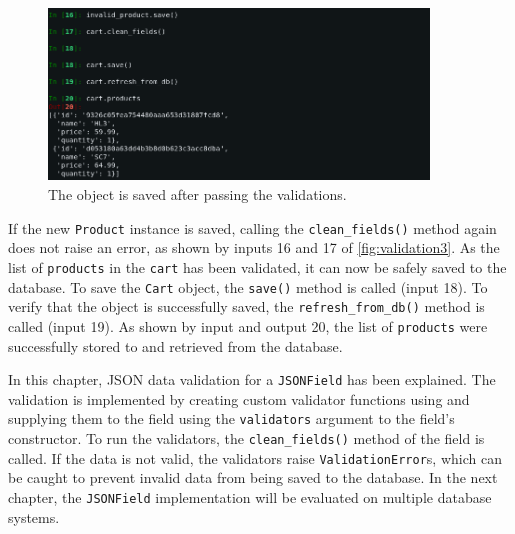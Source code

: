 \begin{figure}
	\centering
    \includegraphics[width=0.90\textwidth]{pics/validation3.png}
	\caption{The  object is saved after passing the validations.}
	\label{fig:validation3}
\end{figure}

If the new \verb|Product| instance is saved, calling the \verb|clean_fields()|
method again does not raise an error, as shown by inputs 16 and 17 of
\autoref{fig:validation3}. As the list of \verb|products| in the \verb|cart|
has been validated, it can now be safely saved to the database. To save the
\verb|Cart| object, the \verb|save()| method is called (input 18). To verify
that the object is successfully saved, the \verb|refresh_from_db()| method is
called (input 19). As shown by input and output 20, the list of \verb|products|
were successfully stored to and retrieved from the database.

In this chapter, JSON data validation for a \verb|JSONField| has been
explained. The validation is implemented by creating custom validator functions
using and supplying them to the field using the \verb|validators| argument to
the field's constructor. To run the validators, the \verb|clean_fields()|
method of the field is called. If the data is not valid, the validators raise
\verb|ValidationError|s, which can be caught to prevent invalid data from being
saved to the database. In the next chapter, the \verb|JSONField| implementation
will be evaluated on multiple database systems.
